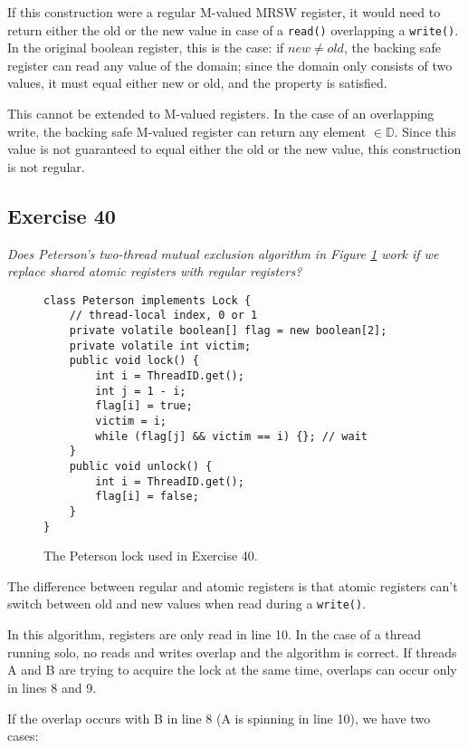 \documentclass[a4paper,10pt]{article}
\begin{document}
If this construction were a regular M-valued MRSW register, it would need
to return either the old or the new value in case of a \lstinline|read()| overlapping
a \lstinline|write()|. In the original boolean register, this is the case: if $new \neq old$,
the backing safe register can read any value of the domain; since the domain only
consists of two values, it must equal either new or old, and the property is satisfied.

This cannot be extended to M-valued registers. In the case of an overlapping write,
the backing safe M-valued register can return any element $\in \mathbb{D}$. Since this
value is not guaranteed to equal either the old or the new value, this construction is
not regular.


\subsection{Exercise 40}

\emph{Does Peterson’s two-thread mutual exclusion algorithm in Figure \ref{fig:peterson}
work if we replace shared atomic registers with regular registers?}

\vspace{3mm}

\begin{figure}
\begin{lstlisting}
class Peterson implements Lock {
    // thread-local index, 0 or 1
    private volatile boolean[] flag = new boolean[2];
    private volatile int victim;
    public void lock() {
        int i = ThreadID.get();
        int j = 1 - i;
        flag[i] = true;
        victim = i;
        while (flag[j] && victim == i) {}; // wait
    }
    public void unlock() {
        int i = ThreadID.get();
        flag[i] = false;
    }
}
\end{lstlisting}
\caption{The Peterson lock used in Exercise 40.}
\label{fig:peterson}
\end{figure}

The difference between regular and atomic registers is that atomic registers can't
switch between old and new values when read during a \lstinline|write()|.

In this algorithm, registers are only read in line 10. In the case of a thread running
solo, no reads and writes overlap and the algorithm is correct. If threads A and B
are trying to acquire the lock at the same time, overlaps can occur only in lines
8 and 9. 

If the overlap occurs with B in line 8 (A is spinning in line 10), we have two cases:
\end{document}

